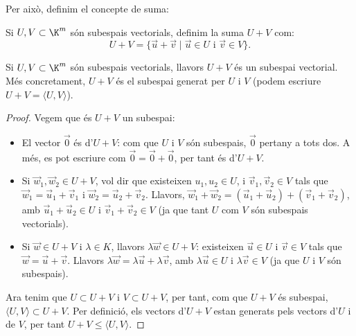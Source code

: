 Per això, definim el concepte de suma:
\begin{definicio}
Si $U,V\subset \K^m$ són subespais vectorials, definim la suma $U+V$  com:
$$
U+V=\{\vec u+\vec v \mid \vec u \in U \text{ i } \vec v \in V\} .
$$
\end{definicio}
\begin{lema}
Si $U,V\subset \K^m$ són subespais vectorials, llavors $U+V$ és un subespai vectorial. Més concretament, $U+V$ és el subespai generat per $U$ i $V$ (podem escriure $U+V=\langle U,V\rangle$). 
\end{lema}
\begin{proof}
    Vegem que és $U+V$ un subespai:
    \begin{itemize}
        \item El vector $\vec 0$ és d'$U+V$: com que $U$ i $V$ són subespais, $\vec 0$ pertany a tots dos. A més, es pot escriure com $\vec 0=\vec 0 +\vec 0$, per tant és d'$U+V$.
        \item Si $\vec w_1,\vec w_2 \in U+V$, vol dir que existeixen $u_1, u_2 \in U$, i $\vec v_1, \vec v_2 \in V$ tals que $\vec w_1=\vec u_1+\vec v_1$ i $\vec w_2=\vec u_2+\vec v_2$. Llavors, $\vec w_1+\vec w_2=(\vec u_1+\vec u_2)+(\vec v_1+\vec v_2)$, amb $\vec u_1+\vec u_2 \in U$ i $\vec v_1+\vec v_2\in V$ (ja que tant $U$ com $V$ són subespais vectorials).
        \item Si $\vec w \in U+V$ i $\lambda \in K$, llavors $\lambda \vec w \in U+V$: existeixen $\vec u \in U$ i $\vec v\in V$ tals que $\vec w=\vec u +\vec v$. Llavors $\lambda \vec w=\lambda \vec u+\lambda \vec v$, amb $\lambda \vec u\in U$ i $\lambda \vec v\in V$ (ja que $U$ i $V$ són subespais).
    \end{itemize}
    Ara tenim que $U\subset U+V$ i $V\subset U+V$, per tant, com que $U+V$ és subespai, $\langle U,V\rangle\subset U+V$. Per definició, els vectors d'$U+V$ estan generats pels vectors d'$U$ i de $V$, per tant $U+V\leq \langle U,V \rangle$.
\end{proof}

